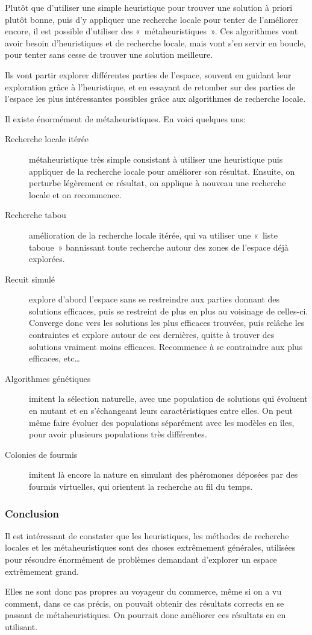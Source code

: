   Plutôt que d'utiliser une simple heuristique pour trouver une solution à priori plutôt
  bonne, puis d'y appliquer une recherche locale pour tenter de l'améliorer encore,
  il est possible d'utiliser des «~métaheuristiques~».
  Ces algorithmes vont avoir besoin d'heuristiques et de recherche locale, mais vont
  s'en servir en boucle, pour tenter sans cesse de trouver une solution meilleure.

  Ils vont partir explorer différentes parties de l'espace, souvent en guidant
  leur exploration grâce à l'heuristique, et en essayant de retomber sur des
  parties de l'espace les plus intéressantes possibles grâce aux algorithmes de
  recherche locale.

  Il existe énormément de métaheuristiques. En voici quelques uns:
  \begin{description}
  \item[Recherche locale itérée] métaheuristique très simple consistant à
    utiliser une heuristique puis appliquer de la recherche locale pour
    améliorer son résultat.  Ensuite, on perturbe légèrement ce résultat, on
    applique à nouveau une recherche locale et on recommence.
  \item[Recherche tabou] amélioration de la recherche locale itérée, qui va
    utiliser une «~liste taboue~» bannissant toute recherche autour des zones de
    l'espace déjà explorées.
  \item[Recuit simulé] explore d'abord l'espace sans se restreindre aux parties
    donnant des solutions efficaces, puis se restreint de plus en plus au
    voisinage de celles-ci. Converge donc vers les solutions les plus efficaces
    trouvées, puis relâche les contraintes et explore autour de ces dernières,
    quitte à trouver des solutions vraiment moins efficaces. Recommence à se
    contraindre aux plus efficaces, etc\dots
  \item[Algorithmes génétiques] imitent la sélection naturelle, avec une
    population de solutions qui évoluent en mutant et en s'échangeant leurs
    caractéristiques entre elles. On peut même faire évoluer des populations
    séparément avec les modèles en îles, pour avoir plusieurs populations très
    différentes.
  \item[Colonies de fourmis] imitent là encore la nature en simulant des
    phéromones déposées par des fourmis virtuelles, qui orientent la recherche
    au fil du temps.
  \end{description}

  \subsubsection{Conclusion}
    Il est intéressant de constater que les heuristiques, les méthodes de
    recherche locales et les métaheuristiques sont des choses extrêmement
    générales, utilisées pour résoudre énormément de problèmes demandant
    d'explorer un espace extrêmement grand.

    Elles ne sont donc pas propres au voyageur du commerce, même si on a vu
    comment, dans ce cas précis, on pouvait obtenir des résultats corrects en
    se passant de métaheuristiques. On pourrait donc améliorer ces résultats en
    en utilisant.
